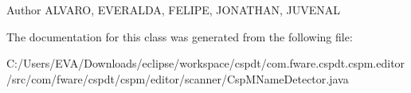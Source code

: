 \begin{DoxyAuthor}{Author}
A\+L\+V\+A\+RO, E\+V\+E\+R\+A\+L\+DA, F\+E\+L\+I\+PE, J\+O\+N\+A\+T\+H\+AN, J\+U\+V\+E\+N\+AL 
\end{DoxyAuthor}


The documentation for this class was generated from the following file\+:\begin{DoxyCompactItemize}
\item 
C\+:/\+Users/\+E\+V\+A/\+Downloads/eclipse/workspace/cspdt/com.\+fware.\+cspdt.\+cspm.\+editor/src/com/fware/cspdt/cspm/editor/scanner/Csp\+M\+Name\+Detector.\+java\end{DoxyCompactItemize}
